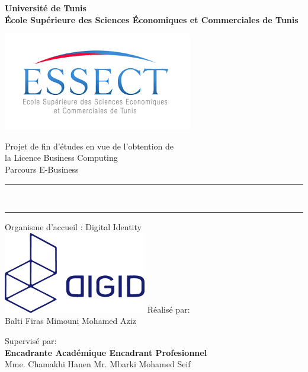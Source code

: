 

\thispagestyle{empty}


\begin{center}
    \textbf{Université de Tunis} \\

    \textbf{École Supérieure des Sciences Économiques et Commerciales de Tunis}

    \vspace{0.9cm}
    \includegraphics[width=0.3 \columnwidth]{chap1.images/essec.png}
    \vspace{0.9cm}

    Projet de fin d'études en vue de l'obtention de \\la Licence Business Computing \\ Parcours E-Business


    \vspace{1.5cm}
    {\hrule height 1pt}
    \vspace{0.5cm}
    \\ \par
    {\hrule height 1pt}
    \par
    \vspace{2cm}


    Organisme d'accueil : Digital Identity
    \\
    \vskip 1cm
    \includegraphics[width=0.18 \columnwidth]{chap1.images/digidlogo.png}
    \vskip 2.5cm
    Réalisé par:
    \\  Balti Firas \hfill  Mimouni Mohamed Aziz   \\
    \vskip 0.8cm

    Supervisé par: \\
    \textbf{Encadrante Académique   \hfill   Encadrant Profesionnel   }
    \\ Mme. Chamakhi Hanen   \hfill     Mr. Mbarki Mohamed Seif  \\


\end{center}

